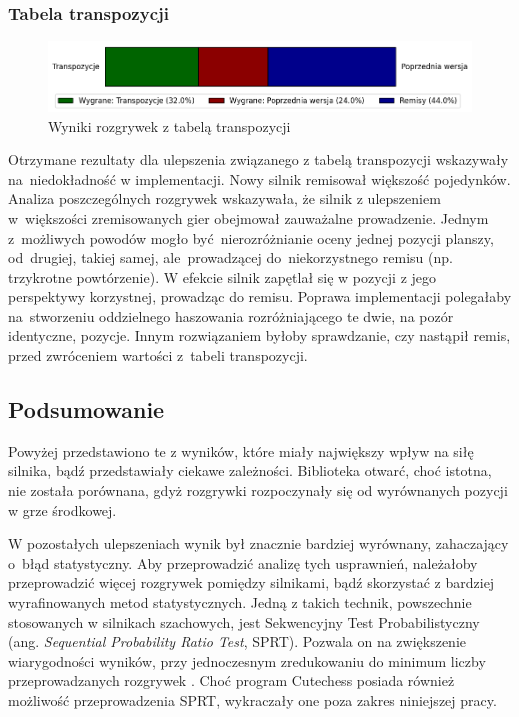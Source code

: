 \subsubsection{Tabela transpozycji}
\begin{figure}[ht]
    \centering
    \includegraphics[width=1\linewidth]{rozdzialy/rozdzial03/1_porownanie-wersji-silnika/rysunki/wyniki-transpozycje}
    \caption{Wyniki rozgrywek z tabelą transpozycji}
    \label{fig:wyniki-transpozycje}
\end{figure}
Otrzymane rezultaty dla ulepszenia związanego z tabelą transpozycji wskazywały na~niedokładność w implementacji.
Nowy silnik remisował większość pojedynków.
Analiza poszczególnych rozgrywek wskazywała, że silnik z ulepszeniem w~większości zremisowanych gier obejmował zauważalne prowadzenie.
Jednym z~możliwych powodów mogło być~nierozróżnianie oceny jednej pozycji planszy, od~drugiej, takiej samej, ale~prowadzącej do~niekorzystnego remisu (np. trzykrotne powtórzenie).
W efekcie silnik zapętlał się w pozycji z jego perspektywy korzystnej, prowadząc do remisu.
Poprawa implementacji polegałaby na~stworzeniu oddzielnego haszowania rozróżniającego te dwie, na pozór identyczne, pozycje.
Innym rozwiązaniem byłoby sprawdzanie, czy nastąpił remis, przed zwróceniem wartości z~tabeli transpozycji.


\subsection{Podsumowanie}\label{subsec:podsumowanie}
Powyżej przedstawiono te z wyników, które miały największy wpływ na siłę silnika, bądź przedstawiały ciekawe zależności.
Biblioteka otwarć, choć istotna, nie została porównana, gdyż rozgrywki rozpoczynały się od wyrównanych pozycji w grze środkowej.

W pozostałych ulepszeniach wynik był znacznie bardziej wyrównany, zahaczający o~błąd statystyczny.
Aby przeprowadzić analizę tych usprawnień, należałoby przeprowadzić więcej rozgrywek pomiędzy silnikami, bądź skorzystać z bardziej wyrafinowanych metod statystycznych.
Jedną z takich technik, powszechnie stosowanych w silnikach szachowych, jest Sekwencyjny Test Probabilistyczny (ang. \emph{Sequential Probability Ratio Test}, SPRT).
Pozwala on na zwiększenie wiarygodności wyników, przy jednoczesnym zredukowaniu do minimum liczby przeprowadzanych rozgrywek \cite*{wiki-sprt}.
Choć program Cutechess posiada również możliwość przeprowadzenia SPRT, wykraczały one poza zakres niniejszej pracy.


